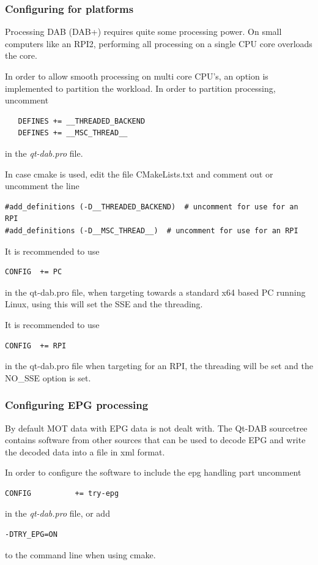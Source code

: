 \documentclass[12pt]{article}
\begin{document}
\subsubsection{Configuring for platforms}
Processing DAB (DAB+) requires quite some processing power. On
small computers like an RPI2, performing all processing on a single
CPU core overloads the core. 
\par
In order to allow smooth processing on multi core CPU's, an option
is implemented to partition the workload.
In order to partition processing, uncomment
{\small
\begin{verbatim}
   DEFINES += __THREADED_BACKEND
   DEFINES += __MSC_THREAD__
\end{verbatim}
}
in the {\em qt-dab.pro} file.
\par
In case cmake is used, edit the file CMakeLists.txt and comment out
or uncomment the line 
\begin{verbatim}
#add_definitions (-D__THREADED_BACKEND)  # uncomment for use for an RPI
#add_definitions (-D__MSC_THREAD__)  # uncomment for use for an RPI
\end{verbatim}

It is recommended to use 
\begin{verbatim}
CONFIG	+= PC
\end{verbatim}
in the qt-dab.pro file,
when targeting towards a standard x64 based PC running Linux, using this
will set the SSE and the threading.
\par
It is recommended to use
\begin{verbatim}
CONFIG	+= RPI
\end{verbatim}
in the qt-dab.pro file when targeting for an RPI, the threading will be
set and the NO\_SSE option is set.
\subsubsection{Configuring EPG processing}
By default MOT data with EPG data is not dealt with. The
Qt-DAB sourcetree contains software from other sources that can be
used to decode EPG and write the decoded data into a file in xml format.
\par
In order to configure the software to include the epg handling part
uncomment
{\small
\begin{verbatim}
CONFIG          += try-epg        
\end{verbatim}
}
in the {\em qt-dab.pro} file, 
or add
{\small
\begin{verbatim}
-DTRY_EPG=ON
\end{verbatim}
}
to the command line when using cmake.
\end{document}
